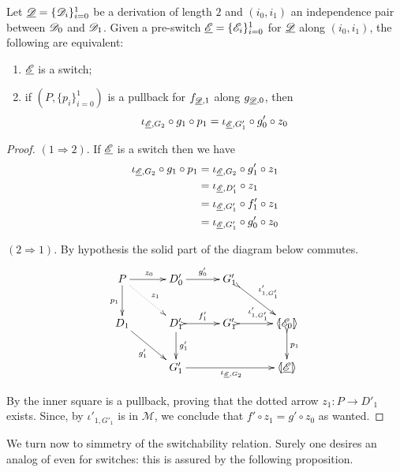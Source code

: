 \begin{lemma}\label{lem:equi}
Let $\underline{\mathscr{D}}=\{\mathscr{D}_{i}\}_{i=0}^1$ be a derivation of length $2$ and $(i_0, i_1)$ an independence pair between $\mathscr{D}_0$ and $\mathscr{D}_1$. Given a pre-switch $\underline{\mathscr{E}}=\{\mathscr{E}_{i}\}_{i=0}^1$ for $\underline{\mathscr{D}}$ along $(i_0, i_1)$, the following are equivalent:
	\begin{enumerate}
		\item $\underline{\mathscr{E}}$ is a switch;
		\item if $(P, \{p_i\}_{i=0}^1)$ is a pullback for $f_{\underline{\mathscr{D}},1}$ along $g_{\underline{\mathscr{D}},0}$, then \[\iota_{\underline{\mathscr{E}}, G_2} \circ g_1\circ p_1=\iota_{\underline{\mathscr{E}}, G'_1}\circ g'_0\circ z_0\]
	\end{enumerate}
\end{lemma}
\begin{proof}$(1 \Rightarrow 2)$. If $\underline{\mathscr{E}}$ is a switch then we have
	\begin{align*}
		\iota_{\underline{\mathscr{E}}, G_2} \circ g_1\circ p_1&=\iota_{\underline{\mathscr{E}}, G_2} \circ g'_1\circ z_1\\&=\iota_{\underline{\mathscr{E}}, D'_1}\circ z_1\\&=\iota_{\underline{\mathscr{E}}, G'_1}\circ f'_1\circ z_1\\&=\iota_{\underline{\mathscr{E}}, G'_1}\circ g'_0\circ z_0
	\end{align*}
	
	\smallskip \noindent $(2\Rightarrow 1)$. By hypothesis the solid part of the diagram below commutes.
	\[\xymatrix@C=30pt{P \ar[r]^{z_0} \ar@{.>}[dr]^{z_1}\ar[d]_{p_1} & D'_0 \ar[r]^{g'_0} & G'_1 \ar@{>->}[dr]^{\iota'_{1, G'_1}}\\ D_1 \ar[dr]_{g'_1}& D'_1 \ar[d]^{g'_1}\ar@{>->}[r]^{f'_1} &G'_1 \ar@{>->}[r]^{\iota'_{1, G'_1}} &\lpro \dder{E}_0 \rpro 	\ar@{>->}[d]^{p_1} \\ & G'_1 	\ar[rr]_{\iota_{\der{E}, G_2}}&& \tpro{E} }\]
	
	By  the inner square is a pullback, proving that the dotted arrow $z_1\colon P\to D'_1$ exists.  Since, by  $\iota'_{1, G'_1}$ is in $\mathcal{M}$, we conclude that $f'\circ z_1=g'\circ z_0$ as wanted.
\end{proof}
\iffalse 
We turn now to simmetry of the switchability relation. Surely one desires an analog of  even for switches: this is assured by the following proposition.

